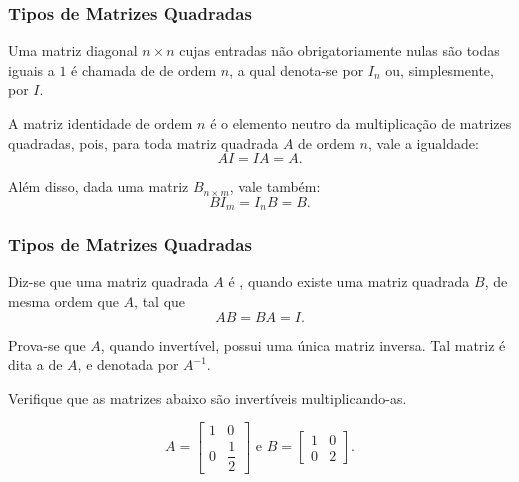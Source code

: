 \begin{frame}
    \frametitle{Tipos de Matrizes Quadradas}
    
    \begin{definicao}
        Uma matriz diagonal $n\times n$ cujas entradas não obrigatoriamente nulas são todas iguais a $1$ é chamada de  de ordem $n$, a qual denota-se por $I_n$ ou, simplesmente, por $I$.
    \end{definicao}\pause
    A matriz identidade de ordem $n$ é o elemento neutro da multiplicação de matrizes quadradas, pois, para toda matriz quadrada $A$ de ordem $n$, vale a igualdade: $$AI = IA = A.$$

    Além disso, dada uma matriz $B_{n \times m}$, vale também: $$BI_m = I_nB = B.$$

\end{frame}


\begin{frame}
    \frametitle{Tipos de Matrizes Quadradas}
    
    \begin{definicao}
        Diz-se que uma matriz quadrada $A$ é  , quando existe uma matriz quadrada $B$, de mesma ordem que $A$, tal que $$AB = BA = I.$$
    \end{definicao}\pause

    Prova-se que $A$, quando invertível, possui uma única matriz inversa. Tal matriz é dita a  de $A$, e denotada por $A^{-1}$.\pause


    \begin{exemplo}
        Verifique que as matrizes abaixo são invertíveis multiplicando-as.
        
        \begin{displaymath} A = 
            \begin{bmatrix}
                1 & 0  \\
                0 & \dfrac 1 2
            \end{bmatrix}
        \text{ e } B = 
            \begin{bmatrix}
                1 & 0  \\
                0 & 2  
            \end{bmatrix}.
        \end{displaymath}
    \end{exemplo}
\end{frame}

